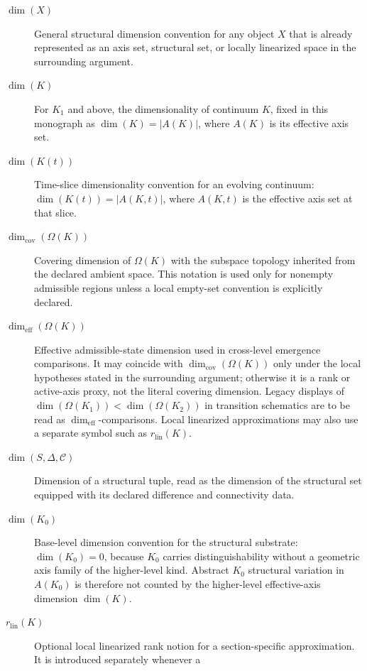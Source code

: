 \begin{description}
  \item[\(\dim(X)\)] General structural dimension convention for any object
        \(X\) that is already represented as an axis set, structural set, or
        locally linearized space in the surrounding argument.
  \item[\(\dim(K)\)] For \(K_1\) and above, the dimensionality of continuum
        \(K\), fixed in this monograph as \(\dim(K)=|A(K)|\), where \(A(K)\)
        is its effective axis set.
  \item[\(\dim(K(t))\)] Time-slice dimensionality convention for an evolving
        continuum: \(\dim(K(t)) = |A(K,t)|\), where \(A(K,t)\) is the
        effective axis set at that slice.
  \item[\(\dim_{\mathrm{cov}}(\Omega(K))\)] Covering dimension of
        \(\Omega(K)\) with the subspace topology inherited from the declared
        ambient space. This notation is used only for nonempty admissible
        regions unless a local empty-set convention is explicitly declared.
  \item[\(\dim_{\mathrm{eff}}(\Omega(K))\)] Effective admissible-state
        dimension used in cross-level emergence comparisons. It may coincide
        with \(\dim_{\mathrm{cov}}(\Omega(K))\) only under the local hypotheses
        stated in the surrounding argument; otherwise it is a rank or active-axis
        proxy, not the literal covering dimension. Legacy displays of
        \(\dim(\Omega(K_1))<\dim(\Omega(K_2))\) in transition schematics are to
        be read as \(\dim_{\mathrm{eff}}\)-comparisons. Local linearized
        approximations may also use a separate symbol such as
        \(r_{\mathrm{lin}}(K)\).
  \item[\(\dim(S,\Delta,\mathcal{C})\)] Dimension of a structural tuple, read
        as the dimension of the structural set equipped with its declared
        difference and connectivity data.
  \item[\(\dim(K_0)\)] Base-level dimension convention for the structural
        substrate: \(\dim(K_0)=0\), because \(K_0\) carries
        distinguishability without a geometric axis family of the higher-level
        kind. Abstract \(K_0\) structural variation in \(A(K_0)\) is therefore
        not counted by the higher-level effective-axis dimension \(\dim(K)\).
  \item[\(r_{\mathrm{lin}}(K)\)] Optional local linearized rank notion for a
        section-specific approximation. It is introduced separately whenever a

\end{description}
